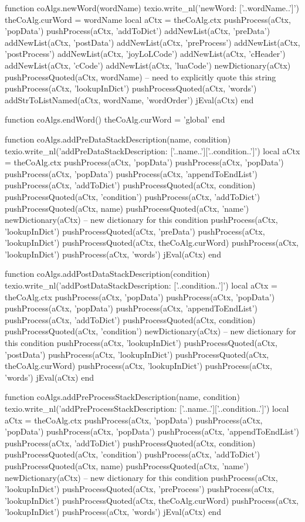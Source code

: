 function coAlgs.newWord(wordName)
  texio.write_nl('newWord: ['..wordName..']')
  theCoAlg.curWord    = wordName
  local aCtx = theCoAlg.ctx
  pushProcess(aCtx, 'popData')
  pushProcess(aCtx, 'addToDict')
  addNewList(aCtx, 'preData')
  addNewList(aCtx, 'postData')
  addNewList(aCtx, 'preProcess')
  addNewList(aCtx, 'postProcess')
  addNewList(aCtx, 'joyLoLCode')
  addNewList(aCtx, 'cHeader')
  addNewList(aCtx, 'cCode')
  addNewList(aCtx, 'luaCode')
  newDictionary(aCtx)
  pushProcessQuoted(aCtx, wordName) -- need to explicitly quote this string
  pushProcess(aCtx, 'lookupInDict')
  pushProcessQuoted(aCtx, 'words')
  addStrToListNamed(aCtx, wordName, 'wordOrder')
  jEval(aCtx)
end

function coAlgs.endWord()
  theCoAlg.curWord = 'global'
end

function coAlgs.addPreDataStackDescription(name, condition)
  texio.write_nl('addPreDataStackDescription: ['..name..']['..condition..']')
  local aCtx = theCoAlg.ctx
  pushProcess(aCtx, 'popData')
  pushProcess(aCtx, 'popData')
  pushProcess(aCtx, 'popData')
  pushProcess(aCtx, 'appendToEndList')
  pushProcess(aCtx, 'addToDict')
  pushProcessQuoted(aCtx, condition)
  pushProcessQuoted(aCtx, 'condition')
  pushProcess(aCtx, 'addToDict')
  pushProcessQuoted(aCtx, name)
  pushProcessQuoted(aCtx, 'name')
  newDictionary(aCtx) -- new dictionary for this condition
  pushProcess(aCtx, 'lookupInDict')
  pushProcessQuoted(aCtx, 'preData')
  pushProcess(aCtx, 'lookupInDict')
  pushProcessQuoted(aCtx, theCoAlg.curWord)
  pushProcess(aCtx, 'lookupInDict')
  pushProcess(aCtx, 'words')
  jEval(aCtx)
end

function coAlgs.addPostDataStackDescription(condition)
  texio.write_nl('addPostDataStackDescription: ['..condition..']')
  local aCtx = theCoAlg.ctx
  pushProcess(aCtx, 'popData')
  pushProcess(aCtx, 'popData')
  pushProcess(aCtx, 'popData')
  pushProcess(aCtx, 'appendToEndList')
  pushProcess(aCtx, 'addToDict')
  pushProcessQuoted(aCtx, condition)
  pushProcessQuoted(aCtx, 'condition')
  newDictionary(aCtx) -- new dictionary for this condition
  pushProcess(aCtx, 'lookupInDict')
  pushProcessQuoted(aCtx, 'postData')
  pushProcess(aCtx, 'lookupInDict')
  pushProcessQuoted(aCtx, theCoAlg.curWord)
  pushProcess(aCtx, 'lookupInDict')
  pushProcess(aCtx, 'words')
  jEval(aCtx)
end

function coAlgs.addPreProcessStackDescription(name, condition)
  texio.write_nl('addPreProcessStackDescription: ['..name..']['..condition..']')
  local aCtx = theCoAlg.ctx
  pushProcess(aCtx, 'popData')
  pushProcess(aCtx, 'popData')
  pushProcess(aCtx, 'popData')
  pushProcess(aCtx, 'appendToEndList')
  pushProcess(aCtx, 'addToDict')
  pushProcessQuoted(aCtx, condition)
  pushProcessQuoted(aCtx, 'condition')
  pushProcess(aCtx, 'addToDict')
  pushProcessQuoted(aCtx, name)
  pushProcessQuoted(aCtx, 'name')
  newDictionary(aCtx) -- new dictionary for this condition
  pushProcess(aCtx, 'lookupInDict')
  pushProcessQuoted(aCtx, 'preProcess')
  pushProcess(aCtx, 'lookupInDict')
  pushProcessQuoted(aCtx, theCoAlg.curWord)
  pushProcess(aCtx, 'lookupInDict')
  pushProcess(aCtx, 'words')
  jEval(aCtx)
end

